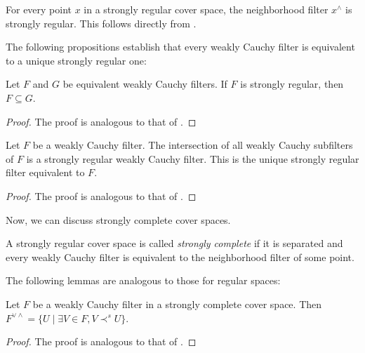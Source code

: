 \documentclass[reqno]{amsart}
\theoremstyle{definition}
\theoremstyle{remark}
\numberwithin{figure}{section}
\newcommand{\rb}{\prec}
\begin{document}
\begin{example}
For every point $x$ in a strongly regular cover space, the neighborhood filter $x^\wedge$ is strongly regular.
This follows directly from .
\end{example}

The following propositions establish that every weakly Cauchy filter is equivalent to a unique strongly regular one:

\begin{prop}
Let $F$ and $G$ be equivalent weakly Cauchy filters.
If $F$ is strongly regular, then $F \subseteq G$.
\end{prop}
\begin{proof}
The proof is analogous to that of .
\end{proof}

\begin{prop}
Let $F$ be a weakly Cauchy filter.
The intersection of all weakly Cauchy subfilters of $F$ is a strongly regular weakly Cauchy filter.
This is the unique strongly regular filter equivalent to $F$.
\end{prop}
\begin{proof}
The proof is analogous to that of .
\end{proof}

Now, we can discuss strongly complete cover spaces.

\begin{defn}
A strongly regular cover space is called \emph{strongly complete} if it is separated and every weakly Cauchy filter is equivalent to the neighborhood filter of some point.
\end{defn}

The following lemmas are analogous to those for regular spaces:

\begin{lem}
Let $F$ be a weakly Cauchy filter in a strongly complete cover space.
Then $F^{\vee \wedge} = \{ U \mid \exists V \in F, V \rb^s U \}$.
\end{lem}
\begin{proof}
The proof is analogous to that of .
\end{proof}
\end{document}

